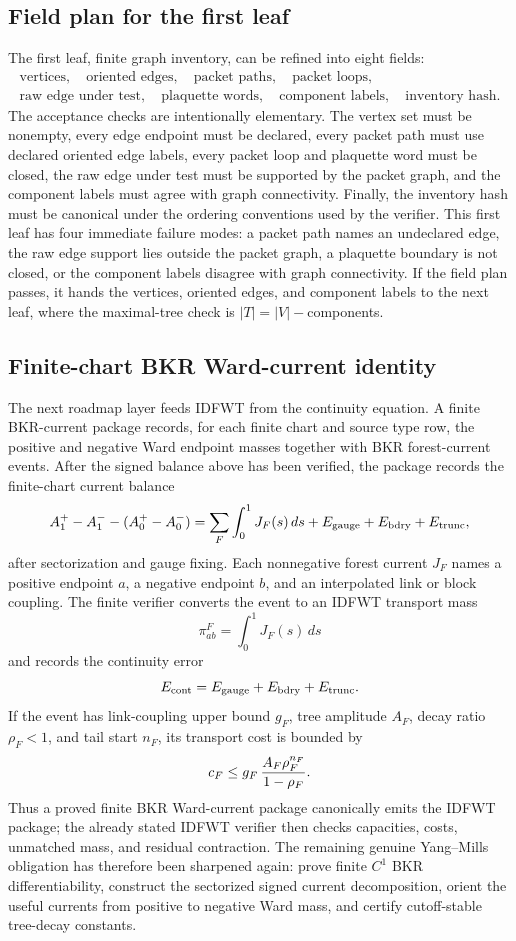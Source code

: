 \subsection{Field plan for the first leaf}
The first leaf, finite graph inventory, can be refined into eight fields:
\[
\begin{gathered}
\text{vertices},\quad \text{oriented edges},\quad \text{packet paths},\quad
\text{packet loops},\\
\text{raw edge under test},\quad \text{plaquette words},\quad
\text{component labels},\quad \text{inventory hash}.
\end{gathered}
\]
The acceptance checks are intentionally elementary.  The vertex set must be
nonempty, every edge endpoint must be declared, every packet path must use
declared oriented edge labels, every packet loop and plaquette word must be
closed, the raw edge under test must be supported by the packet graph, and the
component labels must agree with graph connectivity.  Finally, the inventory
hash must be canonical under the ordering conventions used by the verifier.
This first leaf has four immediate failure modes: a packet path names an
undeclared edge, the raw edge support lies outside the packet graph, a
plaquette boundary is not closed, or the component labels disagree with graph
connectivity.  If the field plan passes, it hands the vertices, oriented
edges, and component labels to the next leaf, where the maximal-tree check is
\(|T|=|V|-\)components.

\subsection{Finite-chart BKR Ward-current identity}
The next roadmap layer feeds IDFWT from the continuity equation.  A finite
BKR-current package records, for each finite chart and source type row, the
positive and negative Ward endpoint masses together with BKR forest-current
events.  After the signed balance above has been verified, the package records
the finite-chart current balance
\[
   A_1^+-A_1^- - (A_0^+-A_0^-)
   =
   \sum_F\int_0^1 J_F(s)\,ds
   + E_{\rm gauge}+E_{\rm bdry}+E_{\rm trunc},
\]
after sectorization and gauge fixing.  Each nonnegative forest current
\(J_F\) names a positive endpoint \(a\), a negative endpoint \(b\), and an
interpolated link or block coupling.  The finite verifier converts the event
to an IDFWT transport mass
\[
  \pi_{ab}^F=\int_0^1J_F(s)\,ds
\]
and records the continuity error
\[
  E_{\rm cont}=E_{\rm gauge}+E_{\rm bdry}+E_{\rm trunc}.
\]
If the event has link-coupling upper bound \(g_F\), tree amplitude \(A_F\),
decay ratio \(\rho_F<1\), and tail start \(n_F\), its transport cost is
bounded by
\[
  c_F \le g_F\,{A_F\rho_F^{n_F}\over 1-\rho_F}.
\]
Thus a proved finite BKR Ward-current package canonically emits the IDFWT
package; the already stated IDFWT verifier then checks capacities, costs,
unmatched mass, and residual contraction.  The remaining genuine
Yang--Mills obligation has therefore been sharpened again: prove finite
\(C^1\) BKR differentiability, construct the sectorized signed current
decomposition, orient the useful currents from positive to negative Ward
mass, and certify cutoff-stable tree-decay constants.

